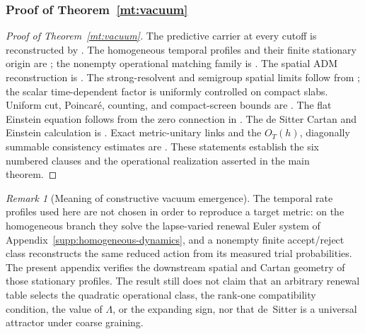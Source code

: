 \documentclass[11pt]{article}
\numberwithin{equation}{section}
\theoremstyle{definition}
\theoremstyle{remark}
\newtheorem{remark}[remark]{Remark}
\begin{document}
\subsubsection{Proof of Theorem~\ref{mt:vacuum}}

\begin{proof}[Proof of Theorem~\ref{mt:vacuum}]
The predictive carrier at every cutoff is reconstructed by
.  The homogeneous temporal profiles and
their finite stationary origin are
;
the nonempty operational matching family is
.  The spatial ADM reconstruction is
.  The strong-resolvent and
semigroup spatial limits follow from ; the scalar
time-dependent factor is uniformly controlled on compact slabs.  Uniform cut,
Poincar\'e, counting, and compact-screen bounds are
.  The flat Einstein equation follows from the
zero connection in .  The de Sitter Cartan and
Einstein calculation is .  Exact metric-unitary
links and the $O_T(h)$, diagonally summable consistency estimates are
.  These statements establish the six numbered clauses and the operational
realization asserted in the main theorem.
\end{proof}

\begin{remark}[Meaning of constructive vacuum emergence]
The temporal rate profiles used here are not chosen in order to reproduce a
target metric: on the homogeneous branch they solve the lapse-varied renewal
Euler system of Appendix~\ref{supp:homogeneous-dynamics}, and a nonempty finite
accept/reject class reconstructs the same reduced action from its measured
trial probabilities.  The present appendix verifies the downstream spatial and
Cartan geometry of those stationary profiles.  The result still does not claim
that an arbitrary renewal table selects the quadratic operational class, the
rank-one compatibility condition, the value of $\Lambda$, or the expanding
sign, nor that de~Sitter is a universal attractor under coarse graining.
\end{remark}
\end{document}

